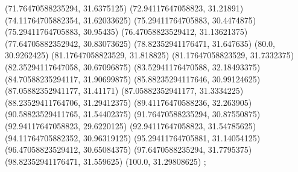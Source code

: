 {{{		(71.76470588235294, 31.6375125)
		(72.94117647058823, 31.21891)
		(74.11764705882354, 31.62033625)
		(75.29411764705883, 30.4474875)
		(75.29411764705883, 30.95435)
		(76.47058823529412, 31.13621375)
		(77.64705882352942, 30.83073625)
		(78.82352941176471, 31.647635)
		(80.0, 30.9262425)
		(81.17647058823529, 31.818825)
		(81.17647058823529, 31.7332375)
		(82.35294117647058, 30.67096875)
		(83.52941176470588, 32.18493375)
		(84.70588235294117, 31.90699875)
		(85.88235294117646, 30.99124625)
		(87.05882352941177, 31.41171)
		(87.05882352941177, 31.3334225)
		(88.23529411764706, 31.29412375)
		(89.41176470588236, 32.263905)
		(90.58823529411765, 31.54402375)
		(91.76470588235294, 30.87550875)
		(92.94117647058823, 29.6220125)
		(92.94117647058823, 31.54785625)
		(94.11764705882352, 30.96319125)
		(95.29411764705881, 31.14054125)
		(96.47058823529412, 30.65084375)
		(97.6470588235294, 31.7795375)
		(98.82352941176471, 31.559625)
		(100.0, 31.29808625)
	};

}}
